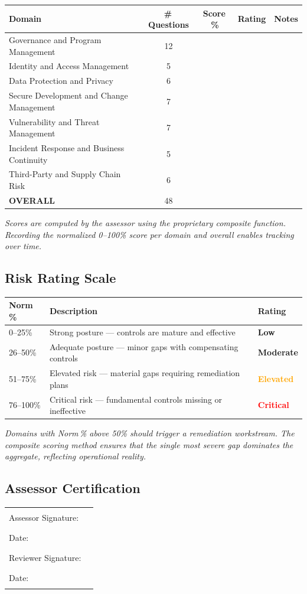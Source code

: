 \documentclass[11pt,landscape]{article}
\begin{document}
\begin{tabularx}{\textwidth}{lcccl}
\toprule
\textbf{Domain} & \textbf{\#\,Questions} & \textbf{Score\,\%} & \textbf{Rating} & \textbf{Notes} \\
\midrule
Governance and Program Management & 12 &  & & \\
Identity and Access Management & 5 &  & & \\
Data Protection and Privacy & 6 &  & & \\
Secure Development and Change Management & 7 &  & & \\
Vulnerability and Threat Management & 7 &  & & \\
Incident Response and Business Continuity & 5 &  & & \\
Third-Party and Supply Chain Risk & 6 &  & & \\
\midrule
\textbf{OVERALL} & 48 &  & & \\
\bottomrule
\end{tabularx}


{\small\textit{Scores are computed by the assessor using the proprietary composite function.
Recording the normalized 0--100\% score per domain and overall enables tracking over time.}}

\subsection{Risk Rating Scale}

\begin{tabularx}{\textwidth}{lXl}
\toprule
\textbf{Norm\,\%} & \textbf{Description} & \textbf{Rating} \\
\midrule
0--25\% & Strong posture --- controls are mature and effective & \textcolor{stridegreen}{\textbf{Low}} \\
26--50\% & Adequate posture --- minor gaps with compensating controls & \textbf{Moderate} \\
51--75\% & Elevated risk --- material gaps requiring remediation plans & \textcolor{orange}{\textbf{Elevated}} \\
76--100\% & Critical risk --- fundamental controls missing or ineffective & \textcolor{red}{\textbf{Critical}} \\
\bottomrule
\end{tabularx}

\vspace{0.3cm}
{\small\textit{Domains with Norm\,\% above 50\% should trigger a remediation workstream.
The composite scoring method ensures that the single most severe gap dominates
the aggregate, reflecting operational reality.}}

\subsection{Assessor Certification}

\vspace{0.5cm}
\begin{tabularx}{\textwidth}{lX}
Assessor Signature: & \rule{6cm}{0.4pt} \\[0.5cm]
Date: & \rule{4cm}{0.4pt} \\[0.5cm]
Reviewer Signature: & \rule{6cm}{0.4pt} \\[0.5cm]
Date: & \rule{4cm}{0.4pt} \\
\end{tabularx}
\end{document}
